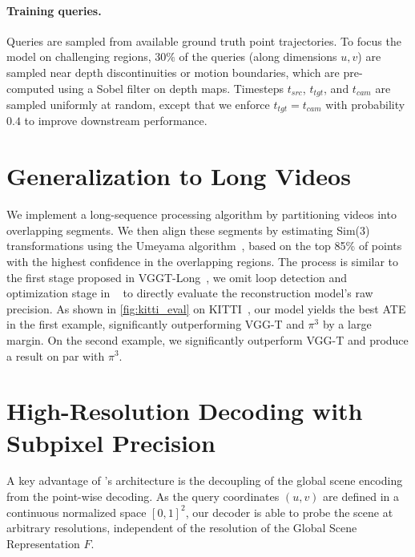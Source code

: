 \paragraph{Training queries.}
Queries are sampled from available ground truth point trajectories.
To focus the model on challenging regions, $30\%$ of the queries (along dimensions $u,v$) are sampled near depth discontinuities or motion boundaries, which are pre-computed using a Sobel filter on depth maps.
Timesteps $t_{src}$, $t_{tgt}$, and $t_{cam}$ are sampled uniformly at random, except that we enforce $t_{tgt} = t_{cam}$ with probability $0.4$ to improve downstream performance.



\clearpage

\section{Generalization to Long Videos}\label{sec:app:long-seq}
We implement a long-sequence processing algorithm by partitioning videos into overlapping segments. We then align these segments by estimating Sim(3) transformations using the Umeyama algorithm~\cite{umeyama1991least}, based on the top 85\% of points with the highest confidence in the overlapping regions. The process is similar to the first stage proposed in VGGT-Long~\cite{deng2025vggtlong}, we omit loop detection and optimization stage in ~\cite{deng2025vggtlong} to directly evaluate the reconstruction model's raw precision. As shown in \cref{fig:kitti_eval} on KITTI~\cite{kitti2013}, our model yields the best ATE in the first example, significantly outperforming VGG-T and $\pi^3$ by a large margin. On the second example, we significantly outperform VGG-T and produce a result on par with $\pi^3$. 





\clearpage

\section{High-Resolution Decoding with Subpixel Precision}\label{sec:app:high-res}


\noindent A key advantage of \name's architecture is the decoupling of the global scene encoding from the point-wise decoding.
As the query coordinates $(u, v)$ are defined in a continuous normalized space $[0, 1]^2$, our decoder is able to probe the scene at arbitrary resolutions, independent of the resolution of the Global Scene Representation $F$.

